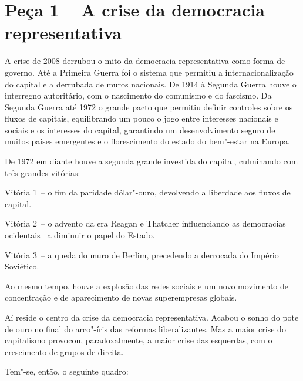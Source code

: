  

\section{Peça 1 -- A crise da democracia representativa}

A crise de 2008 derrubou o mito da democracia representativa como forma
de governo. Até a Primeira Guerra foi o sistema que permitiu a
internacionalização do capital e a derrubada de muros nacionais. De 1914
à Segunda Guerra houve o interregno autoritário, com o nascimento do
comunismo e do fascismo. Da Segunda Guerra até 1972 o grande pacto que
permitiu definir controles sobre os fluxos de capitais, equilibrando um
pouco o jogo entre interesses nacionais e sociais e os interesses do
capital, garantindo um desenvolvimento seguro de muitos países
emergentes e o florescimento do estado do bem"-estar na Europa.

De 1972 em diante houve a segunda grande investida do capital,
culminando com três grandes vitórias:

Vitória 1~-- o fim da paridade dólar"-ouro, devolvendo a liberdade aos
fluxos de capital.

Vitória 2~-- o advento da era Reagan e Thatcher influenciando as
democracias ocidentais~ a diminuir o papel do Estado.

Vitória 3~-- a queda do muro de Berlim, precedendo a derrocada do
Império Soviético.

Ao mesmo tempo, houve a explosão das redes sociais e um novo movimento
de concentração e de aparecimento de novas superempresas globais.

Aí reside o centro da crise da democracia representativa. Acabou o sonho
do pote de ouro no final do arco"-íris das reformas liberalizantes. Mas a
maior crise do capitalismo provocou, paradoxalmente, a maior crise das
esquerdas, com o crescimento de grupos de direita.

Tem"-se, então, o seguinte quadro:

